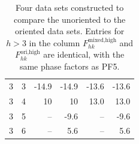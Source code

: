 \begin{table}[htbp]
\begin{tabular}{rrrrrr}
    3      & 3      & -14.9  & -14.9  & -13.6  & -13.6  \\
    3      & 4      & 10     & 10     & 13.0   & 13.0   \\
    3      & 5      & --     & -9.6   & --     & -9.6   \\
    3      & 6      & --     & 5.6    & --     & 5.6    \\
    \hline
  \end{tabular}%
  \caption[Four data sets constructed to compare the unoriented to
  the oriented data sets]
  {Four data sets constructed to compare the unoriented to
  the oriented data sets. Entries for $h > 3$ in the column $F_{hk}^\text{mixed,high}$ 
  and $F_{hk}^\text{ori,high}$ are identical, with the same phase factors as PF5.}
  \label{tab:cmu_vs_wackwebb1}%
\end{table}%

